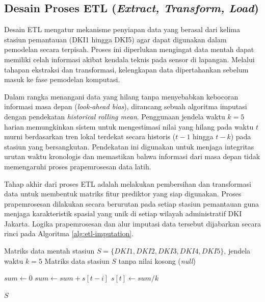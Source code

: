 \subsection{Desain Proses ETL (\textit{Extract, Transform, Load})}

Desain ETL mengatur mekanisme penyiapan data yang berasal dari kelima stasiun pemantauan (DKI1 hingga DKI5) agar dapat digunakan dalam pemodelan secara terpisah. Proses ini diperlukan mengingat data mentah dapat memiliki celah informasi akibat kendala teknis pada sensor di lapangan. Melalui tahapan ekstraksi dan transformasi, kelengkapan data dipertahankan sebelum masuk ke fase pemodelan komputasi.

Dalam rangka menangani data yang hilang tanpa menyebabkan kebocoran informasi masa depan (\textit{look-ahead bias}), dirancang sebuah algoritma imputasi dengan pendekatan \textit{historical rolling mean}. Penggunaan jendela waktu $k=5$ harian memungkinkan sistem untuk mengestimasi nilai yang hilang pada waktu $t$ murni berdasarkan tren lokal terdekat secara historis ($t-1$ hingga $t-k$) pada stasiun yang bersangkutan. Pendekatan ini digunakan untuk menjaga integritas urutan waktu kronologis dan memastikan bahwa informasi dari masa depan tidak memengaruhi proses prapemrosesan data latih.

Tahap akhir dari proses ETL adalah melakukan pembersihan dan transformasi data untuk membentuk matriks fitur prediktor yang siap digunakan. Proses prapemrosesan dilakukan secara berurutan pada setiap stasiun pemantauan guna menjaga karakteristik spasial yang unik di setiap wilayah administratif DKI Jakarta. Logika prapemrosesan dan alur imputasi data tersebut dijabarkan secara rinci pada Algoritma \ref{alg:etl-imputation}.

\begin{algorithm}[htbp]
\caption{Algoritma Prapemrosesan dan Imputasi \textit{Rolling Mean} per Stasiun}
\label{alg:etl-imputation}
\begin{algorithmic}[1] 
\Require Matriks data mentah stasiun $S = \{DKI1, DKI2, DKI3, DKI4, DKI5\}$, jendela waktu $k = 5$
\Ensure Matriks data stasiun $S$ tanpa nilai kosong (\textit{null})

            \State $sum \gets 0$
                \State $sum \gets sum + s[t-i]$
            \EndFor
            \State $s[t] \gets sum / k$ 
        \EndIf
    \EndFor
\EndFor

\State \Return $S$
\end{algorithmic}
\end{algorithm}

